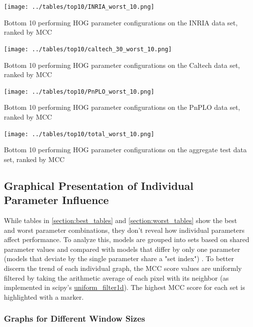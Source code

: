 \begin{table}
    \centering
    \texttt{[image: ../tables/top10/INRIA\_worst\_10.png]}
    \caption{Bottom 10 performing HOG parameter configurations on the INRIA data set, ranked by MCC}
\end{table}

\begin{table}
    \centering
    \texttt{[image: ../tables/top10/caltech\_30\_worst\_10.png]}
    \caption{Bottom 10 performing HOG parameter configurations on the Caltech data set, ranked by MCC}
\end{table}

\begin{table}
    \centering
    \texttt{[image: ../tables/top10/PnPLO\_worst\_10.png]}
    \caption{Bottom 10 performing HOG parameter configurations on the PnPLO data set, ranked by MCC}
\end{table}

\begin{table}
    \centering
    \texttt{[image: ../tables/top10/total\_worst\_10.png]}
    \caption{Bottom 10 performing HOG parameter configurations on the aggregate test data set, ranked by MCC}
    \label{table:last_param_table}
\end{table}

\subsection{Graphical Presentation of Individual Parameter Influence}

While tables in \ref{section:best_tables} and \ref{section:worst_tables} show the best and worst parameter combinations, they don't reveal how individual parameters affect performance. To analyze this, models are grouped into sets based on shared parameter values and compared with models that differ by only one parameter (models that deviate by the single parameter share a "set index") . To better discern the trend of each individual graph, the MCC score values are uniformly filtered by taking the arithmetic average of each pixel with its neighbor (as implemented in scipy's \href{https://docs.scipy.org/doc/scipy/reference/generated/scipy.ndimage.uniform_filter1d.html}{uniform\_filter1d}). The highest MCC score for each set is highlighted with a marker.

\subsubsection{Graphs for Different Window Sizes}

